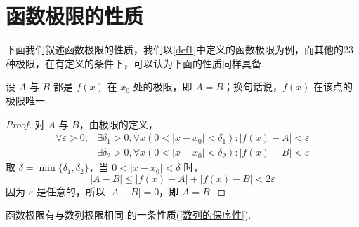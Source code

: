 \section{函数极限的性质}
下面我们叙述函数极限的性质，我们以\ref{def1}中定义的函数极限为例，而其他的23种极限，在有定义的条件下，可以认为下面的性质同样具备.

\begin{proposition}
	设 $A$ 与 $B$ 都是 $f(x)$ 在 $x_0$ 处的极限，即 $A = B$；换句话说，$f(x)$ 在该点的极限唯一.
\end{proposition}
\begin{proof}
	对 $A$ 与 $B$，由极限的定义，
	$$\begin{aligned}
		\forall \varepsilon > 0, &\exists \delta_1 > 0, \forall x (0 < |x - x_0| < \delta_1): |f(x) - A| < \varepsilon\\
		&\exists \delta_2 > 0, \forall x (0 < |x - x_0| < \delta_2): |f(x) - B| < \varepsilon
	\end{aligned}$$
	取 $\delta = \min\{\delta_1,\delta_2\}$，当 $0 < |x - x_0| < \delta$ 时，
	\[
	|A - B| \leqslant |f(x) - A| + |f(x) - B| < 2\varepsilon
	\]
	因为 $\varepsilon$ 是任意的，所以 $|A - B| = 0$，即 $A = B$.
\end{proof}
函数极限有与数列极限相同 的一条性质(\ref{数列的保序性}).

